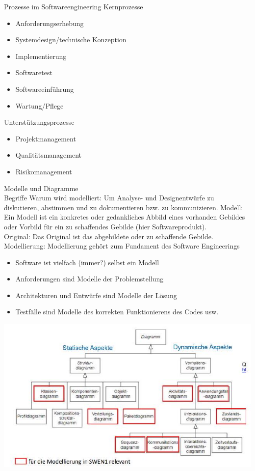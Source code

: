 \begin{theorem}{Prozesse im Softwareengineering Kernprozesse}
\begin{itemize}
  \item Anforderungserhebung
  \item Systemdesign/technische Konzeption
  \item Implementierung
  \item Softwaretest
  \item Softwareeinführung
  \item Wartung/Pflege
\end{itemize}
\end{theorem}

\begin{corollary}{Unterstützungsprozesse}
\begin{itemize}
  \item Projektmanagement
  \item Qualitätsmanagement
  \item Risikomanagement
\end{itemize}
\end{corollary}

\begin{concept}{Modelle und Diagramme}\\
Begriffe Warum wird modelliert: Um Analyse- und Designentwürfe zu diskutieren, abstimmen und zu dokumentieren bzw. zu kommunizieren. Modell: Ein Modell ist ein konkretes oder gedankliches Abbild eines vorhanden Gebildes oder Vorbild für ein zu schaffendes Gebilde (hier Softwareprodukt).\\
Original: Das Original ist das abgebildete oder zu schaffende Gebilde.\\
Modellierung: Modellierung gehört zum Fundament des Software Engineerings
\begin{itemize}
  \item Software ist vielfach (immer?) selbst ein Modell
  \item Anforderungen sind Modelle der Problemstellung
  \item Architekturen und Entwürfe sind Modelle der Lösung
  \item Testfälle sind Modelle des korrekten Funktionierens des Codes usw.\\
\end{itemize}
\includegraphics[width=\linewidth]{images/2024_12_29_0d1d7b5551ea1b4b41bdg-01(1)}
\end{concept}

